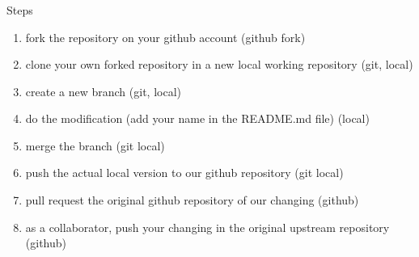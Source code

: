 \begin{frame}[containsverbatim]
\frametitle{}
\begin{exampleblock}{Steps}
\begin{enumerate}
    \item fork the repository on your github account (github fork)
    \item clone your own forked repository in a new local working repository (git, local)
    \item create a new branch (git, local)
    \item do the modification (add your name in the README.md file) (local)
    \item merge the branch (git local)
    \item push the actual local version to our github repository (git local)
    \item pull request the original github repository of our changing (github)
    \item as a collaborator, push your changing in the original upstream repository (github)
\end{enumerate}
\end{exampleblock}
\end{frame}
